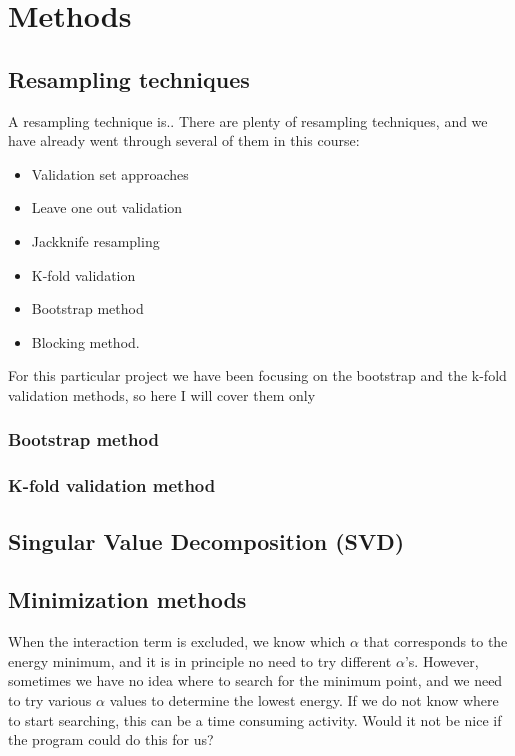 \section{Methods} \label{sec:methods}

\subsection{Resampling techniques} \label{sec:resampling}
A resampling technique is..
There are plenty of resampling techniques, and we have already went through several of them in this course:
\begin{itemize}
\item{Validation set approaches}
\item{Leave one out validation}
\item{Jackknife resampling}
\item{K-fold validation}
\item{Bootstrap method}
\item{Blocking method}.
\end{itemize}
For this particular project we have been focusing on the bootstrap and the k-fold validation methods, so here I will cover them only

\subsubsection{Bootstrap method} \label{sec:bootstrap}

\subsubsection{K-fold validation method} \label{sec:kfold}


\subsection{Singular Value Decomposition (SVD)} \label{sec:svd}

\subsection{Minimization methods} \label{sec:minimization}
When the interaction term is excluded, we know which $\alpha$ that corresponds to the energy minimum, and it is in principle no need to try different $\alpha$'s. However, sometimes we have no idea where to search for the minimum point, and we need to try various $\alpha$ values to determine the lowest energy. If we do not know where to start searching, this can be a time consuming activity. Would it not be nice if the program could do this for us?

